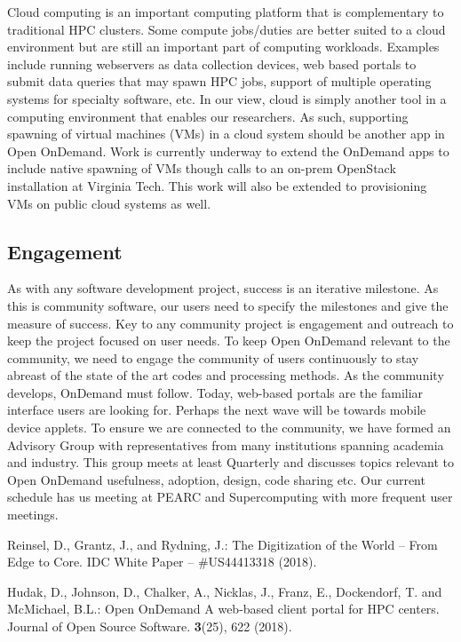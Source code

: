 \documentclass[runningheads]{llncs}
\begin{document}
Cloud computing is an important computing platform that is complementary to traditional HPC clusters.  Some compute jobs/duties are better suited to a cloud environment but are still an important part of computing workloads.  Examples include running webservers as data collection devices, web based portals to submit data queries that may spawn HPC jobs, support of multiple operating systems for specialty software, etc.  In our view, cloud is simply another tool in a computing environment that enables our researchers.  As such, supporting spawning of virtual machines (VMs) in a cloud system should be another app in Open OnDemand.  Work is currently underway to extend the OnDemand apps to include native spawning of VMs though calls to an on-prem OpenStack installation at Virginia Tech.  This work will also be extended to provisioning VMs on public cloud systems as well.

\subsection{Engagement}

As with any software development project, success is an iterative milestone.  As this is community software, our users need to specify the milestones and give the measure of success.  Key to any community project is engagement and outreach to keep the project focused on user needs.  To keep Open OnDemand relevant to the community, we need to engage the community of users continuously to stay abreast of the state of the art codes and processing methods.  As the community develops, OnDemand must follow.  Today, web-based portals are the familiar interface users are looking for.  Perhaps the next wave will be towards mobile device applets.  To ensure we are connected to the community, we have formed an Advisory Group with representatives from many institutions spanning academia and industry.  This group meets at least Quarterly and discusses topics relevant to Open OnDemand usefulness, adoption, design, code sharing etc.  Our current schedule has us meeting at PEARC and Supercomputing with more frequent user meetings.  


%
%
%
% 
% 
%
\begin{thebibliography}{8}

Reinsel, D., Grantz, J., and Rydning, J.: The Digitization of the World -- From Edge to Core. IDC White Paper – \#US44413318 (2018).

Hudak, D., Johnson, D., Chalker, A., Nicklas, J., Franz, E., Dockendorf, T. and McMichael, B.L.: Open OnDemand A web-based client portal for HPC centers. Journal of Open Source Software. \textbf{3}(25), 622 (2018). 
\end{thebibliography}
\end{document}
